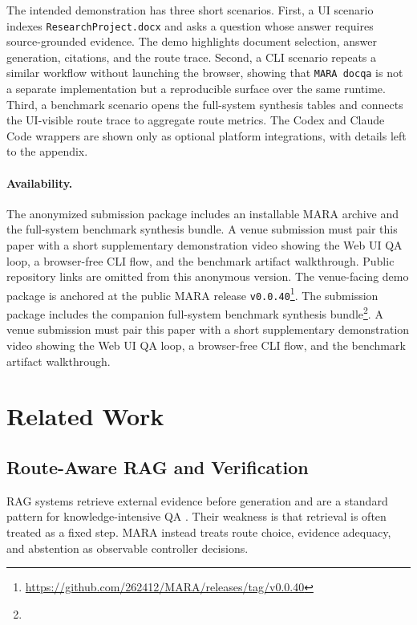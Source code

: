 The intended demonstration has three short scenarios. First, a UI scenario indexes \texttt{ResearchProject.docx} and asks a question whose answer requires source-grounded evidence. The demo highlights document selection, answer generation, citations, and the route trace. Second, a CLI scenario repeats a similar workflow without launching the browser, showing that \texttt{MARA docqa} is not a separate implementation but a reproducible surface over the same runtime. Third, a benchmark scenario opens the full-system synthesis tables and connects the UI-visible route trace to aggregate route metrics. The Codex and Claude Code wrappers are shown only as optional platform integrations, with details left to the appendix.

\ifmaravenue
\paragraph{Availability.}
\ifmaraanonymous
The anonymized submission package includes an installable MARA archive and the full-system benchmark synthesis bundle. A venue submission must pair this paper with a short supplementary demonstration video showing the Web UI QA loop, a browser-free CLI flow, and the benchmark artifact walkthrough. Public repository links are omitted from this anonymous version.
\else
The venue-facing demo package is anchored at the public MARA release \texttt{v0.0.40}\footnote{\url{https://github.com/262412/MARA/releases/tag/v0.0.40}}. The submission package includes the companion full-system benchmark synthesis bundle\footnote{}. A venue submission must pair this paper with a short supplementary demonstration video showing the Web UI QA loop, a browser-free CLI flow, and the benchmark artifact walkthrough.
\fi
\fi

\section{Related Work}

\subsection{Route-Aware RAG and Verification}

RAG systems retrieve external evidence before generation and are a standard pattern for knowledge-intensive QA \citep{lewis2020rag,karpukhin2020dpr,gao2023rag}. Their weakness is that retrieval is often treated as a fixed step. MARA instead treats route choice, evidence adequacy, and abstention as observable controller decisions.

